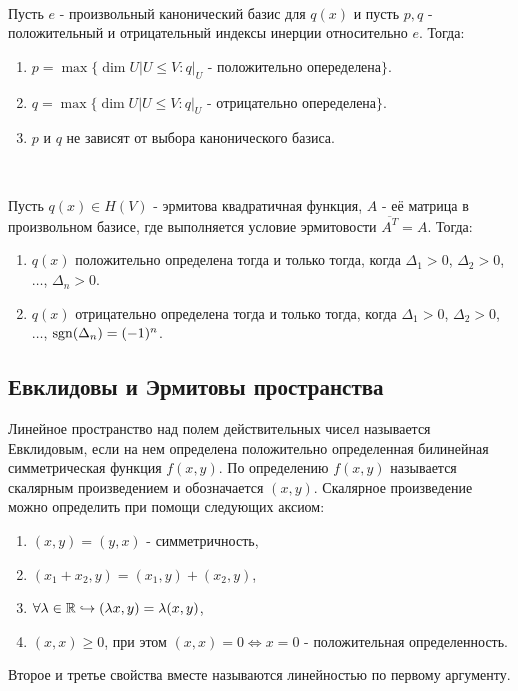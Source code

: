 \begin{proposition}~ 

    Пусть $e$ - произвольный канонический базис для $q(x)$ и пусть $p, q$ - положительный и отрицательный
    индексы инерции относительно $e$. Тогда:
    \begin{enumerate}
        \item $p = \max \{\dim U | U \leq V: q \vert_{U} \text{ - положительно опеределена}\}$.
        \item $q = \max \{\dim U | U \leq V: q \vert_{U} \text{ - отрицательно опеределена}\}$.
        \item $p$ и $q$ не зависят от выбора канонического базиса.
    \end{enumerate}
\end{proposition}

\begin{proposition}~ 

    Пусть $q(x) \in H(V)$ - эрмитова квадратичная функция, $A$ - её матрица в произвольном базисе, где 
    выполняется условие эрмитовости $\overline{A^T} = A$. Тогда:
    \begin{enumerate}
        \item $q(x)$ положительно определена тогда и только тогда, когда $\Delta_1 > 0$, $\Delta_2 > 0$, $\dots$, 
        $\Delta_n > 0$.
        \item $q(x)$ отрицательно определена тогда и только тогда, когда $\Delta_1 > 0$, $\Delta_2 > 0$, $\dots$, 
        $\operatorname{sgn} (\Delta_n) = (-1)^n$.
    \end{enumerate}
\end{proposition}

\subsection{Евклидовы и Эрмитовы пространства}

\begin{definition}
    Линейное пространство над полем действительных чисел называется Евклидовым, если 
    на нем определена положительно определенная билинейная симметрическая функция $f(x, y)$. По 
    определению $f(x, y)$ называется скалярным произведением и обозначается $(x, y)$.
    Скалярное произведение можно определить при помощи следующих аксиом:
    \begin{enumerate}
        \item $(x, y) = (y, x)$ - симметричность,
        \item $(x_1 + x_2, y) = (x_1, y) + (x_2, y)$, 
        \item $\forall \lambda \in \mathbb{R} \hookrightarrow (\lambda x, y) = \lambda(x, y)$,
        \item $(x, x) \geq 0$, при этом $(x, x) = 0 \Leftrightarrow x = 0$ - положительная определенность.
    \end{enumerate}
    Второе и третье свойства вместе называются линейностью по первому аргументу.
\end{definition}

